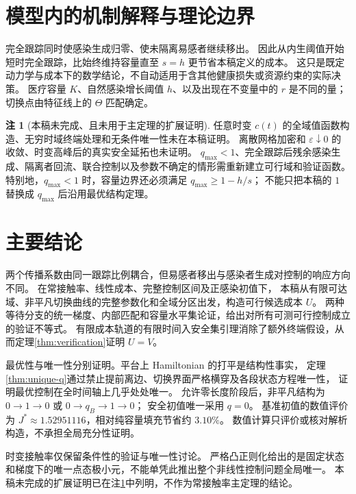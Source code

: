 \documentclass[11pt,a4paper,UTF8]{ctexart}
\theoremstyle{definition}
\newtheorem{remark}[theorem]{注}
\begin{document}
\section{模型内的机制解释与理论边界}
\label{sec:limitations}
完全跟踪同时使感染生成归零、使未隔离易感者继续移出。
因此从内生阈值开始短时完全跟踪，比始终维持容量直至 $s=h$ 更节省本稿定义的成本。
这只是既定动力学与成本下的数学结论，不自动适用于含其他健康损失或资源约束的实际决策。
医疗容量 $K$、自然感染增长阈值 $h$、以及出现在不变量中的 $r$ 是不同的量；切换点由特征线上的 $\Theta$ 匹配确定。

\begin{remark}[本稿未完成、且未用于主定理的扩展证明]
\label{rem:unproved-extensions}
任意时变 $c(t)$ 的全域值函数构造、无穷时域终端处理和无条件唯一性未在本稿证明。
离散网格加密和 $\varepsilon\downarrow0$ 的收敛、时变高峰后的真实安全延拓也未证明。
$q_{\max}<1$、完全跟踪后残余感染生成、隔离者回流、联合控制以及参数不确定的情形需重新建立可行域和验证函数。
特别地，$q_{\max}<1$ 时，容量边界还必须满足 $q_{\max}\ge1-h/s$；
不能只把本稿的 $1$ 替换成 $q_{\max}$ 后沿用最优结构定理。
\end{remark}
\fi

\section{主要结论}
\label{sec:conclusions}
两个传播系数由同一跟踪比例耦合，但易感者移出与感染者生成对控制的响应方向不同。
在常接触率、线性成本、完整控制区间及正感染初值下，
本稿从有限可达域、非平凡切换曲线的完整参数化和全域分区出发，构造可行候选成本 $U$。
两种等待分支的统一梯度、内部匹配和容量水平集论证，给出对所有可测可行控制成立的验证不等式。
有限成本轨道的有限时间入安全集引理消除了额外终端假设，从而定理\ref{thm:verification}证明 $U=V$。

最优性与唯一性分别证明。平台上 Hamiltonian 的打平是结构性事实，
定理\ref{thm:unique-q}通过禁止提前离边、切换界面严格横穿及各段状态方程唯一性，
证明最优控制在全时间轴上几乎处处唯一。
允许零长度阶段后，非平凡结构为 $0\to1\to0$ 或 $0\to q_B\to1\to0$；
安全初值唯一采用 $q=0$。
基准初值的数值评价为 $J^*\approx1.52951116$，相对纯容量填充节省约 $3.10\%$。
数值计算只评价或核对解析构造，不承担全局充分性证明。

\ifdefined\TheoryOnly\else
时变接触率仅保留条件性的验证与唯一性讨论。
严格凸正则化给出的是固定状态和梯度下的唯一点态极小元，不能单凭此推出整个非线性控制问题全局唯一。
本稿未完成的扩展证明已在注\ref{rem:unproved-extensions}中列明，不作为常接触率主定理的结论。
\fi
\end{document}
